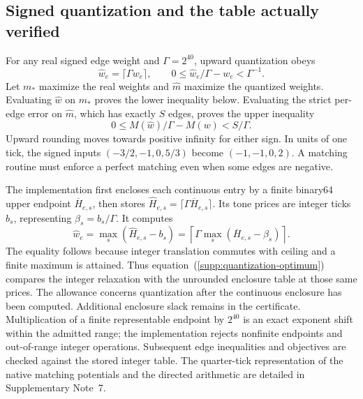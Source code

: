 \subsection{Signed quantization and the table actually verified}
For any real signed edge weight and $\Gamma=2^{40}$, upward quantization obeys
\begin{equation}
 \widehat w_e=\lceil\Gamma w_e\rceil,
 \qquad 0\le\widehat w_e/\Gamma-w_e<\Gamma^{-1}.
 \label{supp:quantization}
\end{equation}
Let $m_*$ maximize the real weights and $\widehat m$ maximize the quantized weights. Evaluating $\widehat w$ on $m_*$ proves the lower inequality below. Evaluating the strict per-edge error on $\widehat m$, which has exactly $S$ edges, proves the upper inequality
\begin{equation}
 0\le M(\widehat w)/\Gamma-M(w)<S/\Gamma.
 \label{supp:quantization-optimum}
\end{equation}
Upward rounding moves towards positive infinity for either sign. In units of one tick, the signed inputs $(-3/2,-1,0,5/3)$ become $(-1,-1,0,2)$. A matching routine must enforce a perfect matching even when some edges are negative.

The implementation first encloses each continuous entry by a finite binary64 upper endpoint $\overline H_{e,s}$, then stores $\widehat H_{e,s}=\lceil\Gamma\overline H_{e,s}\rceil$. Its tone prices are integer ticks $b_s$, representing $\beta_s=b_s/\Gamma$. It computes
\begin{equation}
 \widehat w_e=\max_s(\widehat H_{e,s}-b_s)
 =\left\lceil\Gamma\max_s(\overline H_{e,s}-\beta_s)\right\rceil.
 \label{supp:table-quantization}
\end{equation}
The equality follows because integer translation commutes with ceiling and a finite maximum is attained. Thus equation~(\ref{supp:quantization-optimum}) compares the integer relaxation with the unrounded enclosure table at those same prices. The allowance concerns quantization after the continuous enclosure has been computed. Additional enclosure slack remains in the certificate. Multiplication of a finite representable endpoint by $2^{40}$ is an exact exponent shift within the admitted range; the implementation rejects nonfinite endpoints and out-of-range integer operations. Subsequent edge inequalities and objectives are checked against the stored integer table. The quarter-tick representation of the native matching potentials and the directed arithmetic are detailed in Supplementary Note~7.

